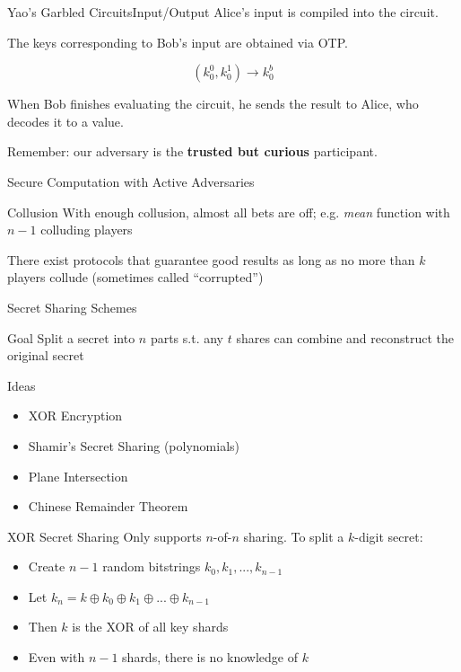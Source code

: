 \documentclass[12pt]{beamer}
\begin{document}
\begin{frame}{Yao's Garbled Circuits}{Input/Output}
	Alice's input is compiled into the circuit.

	The keys corresponding to Bob's input are obtained via OTP.

	\[ (k_0^0, k_0^1) \rightarrow k_0^b \]

	When Bob finishes evaluating the circuit, he sends the result to Alice, who
	decodes it to a value.

	\begin{block}{}
		Remember: our adversary is the \textbf{trusted but curious} participant.
	\end{block}
\end{frame}

\begin{frame}{Secure Computation with Active Adversaries}
	\begin{block}{Collusion}
		With enough collusion, almost all bets are off; e.g. \textit{mean}
		function with $n-1$ colluding players
	\end{block}

	\begin{block}{}
		There exist protocols that guarantee good results as long as no more
		than $k$ players collude (sometimes called ``corrupted'')
	\end{block}
\end{frame}

\begin{frame}{Secret Sharing Schemes}
	\begin{block}{Goal}
		Split a secret into $n$ parts s.t. any $t$ shares can combine and
		reconstruct the original secret
	\end{block}

	\begin{block}{Ideas}
		\begin{itemize}
			\pause
			\item XOR Encryption
			\item Shamir's Secret Sharing (polynomials)
			\item Plane Intersection
			\item Chinese Remainder Theorem
		\end{itemize}
	\end{block}
\end{frame}

\begin{frame}{XOR Secret Sharing}
	Only supports $n$-of-$n$ sharing. To split a $k$-digit secret:
	\begin{itemize}
		\item Create $n-1$ random bitstrings $k_0, k_1, ..., k_{n-1}$
		\item Let $k_n = k \oplus k_0 \oplus k_1 \oplus ... \oplus k_{n-1}$
		\item Then $k$ is the XOR of all key shards
		\item Even with $n-1$ shards, there is no knowledge of $k$
	\end{itemize}
\end{frame}
\end{document}
